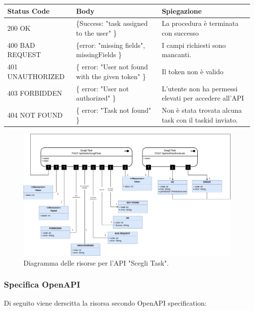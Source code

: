 \documentclass{report}
\begin{document}
\begin{center} %
	\centering
	\begin{tabular}{ |p{4cm}|p{4cm}|p{4cm}| }
		\hline
		\centering Status Code & \qquad\qquad\quad Body & \qquad\quad Spiegazione\\ %
		\hline
		200 OK & \{Success: "task assigned to the user" \}  & La procedura è terminata con successo	\\ 
		\hline
		400 BAD REQUEST & \{error: "missing fields", missingFields \} & I campi richiesti sono mancanti. \\
		\hline
		401 UNAUTHORIZED & \{ error: "User not found with the given token" \} & Il token non è valido \\
		\hline
		403 FORBIDDEN & \{ error: "User not authorized" \} &  L'utente non ha permessi elevati per accedere all'API \\
		\hline
		404 NOT FOUND & \{ error: "Task not found" \} & Non è stata trovata alcuna task con il taskid inviato. \\
		\hline
	\end{tabular}
\end{center}


\begin{figure}[H]
	\centering\includegraphics[width=1\textwidth]{images/scegli_task_model.png}
	Diagramma delle risorse per l'API "Scegli Task".
\end{figure}

\subsubsection*{Specifica OpenAPI}

Di seguito viene derscitta la risorsa secondo OpenAPI specification:
\end{document}
